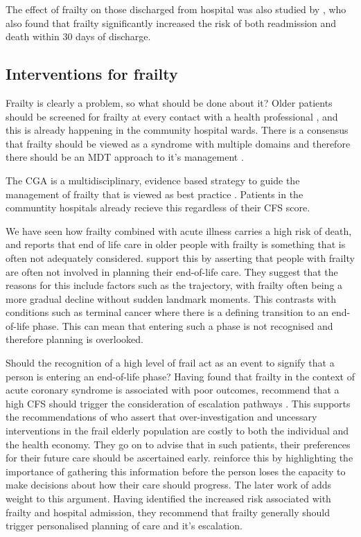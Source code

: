\documentclass
[
	12pt,
	a4paper,
	oneside,
]{article}
\begin{document}
The effect of frailty on those discharged from hospital was also studied by 
\parencite{kahlon:15}, who also found that frailty significantly increased the 
risk of both readmission and death within 30 days of discharge.

\subsection{Interventions for frailty}
Frailty is clearly a problem, so what should be done about it? Older patients 
should be screened for frailty at every contact with a health professional 
\parencite{bgs:14}, and 
this is already happening in the community hospital wards. There is a consensus that 
frailty should be viewed as a syndrome with multiple domains and therefore
there should be an MDT approach to it's management \parencite{vellas:16}.

The CGA is a multidisciplinary, evidence based strategy to guide the management 
of frailty that is viewed as best practice \parencite{silver:12, bgs:14, oliver:14}. Patients
in the communtity hospitals already recieve this regardless of their CFS score.

We have seen how frailty combined with acute illness carries a high risk of death, and 
\textcite{silver:12} reports that end of life care in older people with frailty
is something that is often not adequately considered. \textcite{oliver:14} support this
by asserting that people with frailty are often not involved in planning their 
end-of-life care. They suggest that the reasons for this include factors such as
the trajectory, with frailty often being a more gradual decline without sudden 
landmark moments. This contrasts with conditions such as terminal cancer where there 
is a defining transition to an end-of-life phase. This can mean that entering such a
phase is not recognised and therefore planning is overlooked. 

Should the recognition of a high level of frail act as an event to signify
that a person is entering an end-of-life phase? Having found that frailty in the 
context of acute coronary syndrome is associated
with poor outcomes, \textcite{kang:15} recommend that a high CFS should
trigger the consideration of escalation pathways \parencite{kang:15}.
This supports the recommendations of \textcite{silver:12} who assert that over-investigation
and uncessary interventions in the frail elderly population are costly to both the
individual and the health economy. They go on to advise that in such patients, 
their preferences for their future care should be ascertained early. \textcite{oliver:14} 
reinforce this by highlighting the importance of gathering this information
before the person loses the capacity to make decisions about how their care should
progress. The later work of \textcite{romero-ortuno:16} adds weight to this argument.
Having identified the increased risk associated with frailty and hospital admission, 
they recommend that frailty generally should trigger personalised planning of
care and it's escalation.
\end{document}
